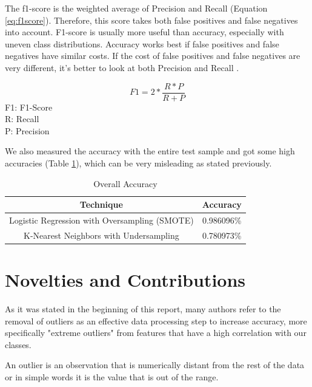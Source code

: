 \documentclass[conference]{IEEEtran}
\begin{document}
The f1-score is the weighted average of Precision and Recall (Equation \ref{eq:f1score}). Therefore, this score takes both false positives and false negatives into account. F1-score is usually more useful than accuracy, especially with uneven class distributions. Accuracy works best if false positives and false negatives have similar costs. If the cost of false positives and false negatives are very different, it’s better to look at both Precision and Recall \cite{ex_f1_score}.

\begin{center}
  \begin{equation} \label{eq:f1score}
    F1 = 2*\frac{R * P}{R + P}
  \end{equation}
  F1: F1-Score \\
  R: Recall \\
  P: Precision
\end{center}

We also measured the accuracy with the entire test sample and got some high accuracies (Table \ref{tab:ov_acc}), which can be very misleading as stated previously.

\begin{table}[H]
\caption{Overall Accuracy}
\label{tab:ov_acc}
\begin{center}
\begin{tabular}{|c|c|}
\hline
\textbf{Technique} & \textbf{Accuracy} \\
\hline
Logistic Regression with Oversampling (SMOTE) & 0.986096\% \\
K-Nearest Neighbors with Undersampling & 0.780973\% \\
\hline
\end{tabular}
\end{center}
\end{table}

\section{Novelties and Contributions}

As it was stated in the beginning of this report, many authors refer to the removal of outliers as an effective data processing step to increase accuracy, more specifically "extreme outliers" from features that have a high correlation with our classes.

An outlier is an observation that is numerically distant from the rest of the data or in simple words it is the value that is out of the range.
\end{document}
